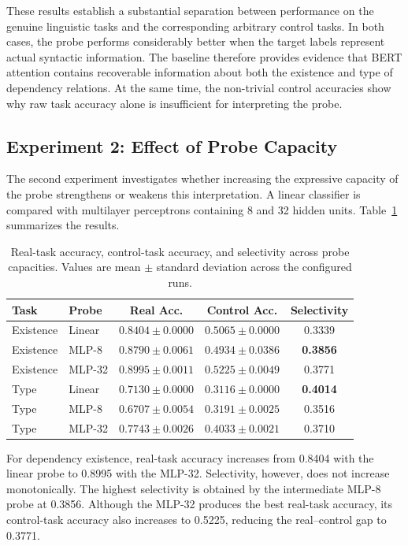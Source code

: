 \documentclass[12pt,a4paper]{article}
\begin{document}
These results establish a substantial separation between performance on the genuine linguistic tasks and the corresponding arbitrary control tasks. In both cases, the probe performs considerably better when the target labels represent actual syntactic information. The baseline therefore provides evidence that BERT attention contains recoverable information about both the existence and type of dependency relations. At the same time, the non-trivial control accuracies show why raw task accuracy alone is insufficient for interpreting the probe.

\subsection{Experiment 2: Effect of Probe Capacity}

The second experiment investigates whether increasing the expressive capacity of the probe strengthens or weakens this interpretation. A linear classifier is compared with multilayer perceptrons containing 8 and 32 hidden units. Table~\ref{tab:capacity-results} summarizes the results.

\begin{table}[htbp]
\centering
\small
\caption{Real-task accuracy, control-task accuracy, and selectivity across probe capacities. Values are mean $\pm$ standard deviation across the configured runs.}
\label{tab:capacity-results}
\begin{tabular}{llccc}
\toprule
\textbf{Task} & \textbf{Probe} & \textbf{Real Acc.} & \textbf{Control Acc.} & \textbf{Selectivity} \\
\midrule
Existence & Linear & $0.8404 \pm 0.0000$ & $0.5065 \pm 0.0000$ & 0.3339 \\
Existence & MLP-8 & $0.8790 \pm 0.0061$ & $0.4934 \pm 0.0386$ & \textbf{0.3856} \\
Existence & MLP-32 & $\mathbf{0.8995} \pm 0.0011$ & $0.5225 \pm 0.0049$ & 0.3771 \\
\midrule
Type & Linear & $0.7130 \pm 0.0000$ & $0.3116 \pm 0.0000$ & \textbf{0.4014} \\
Type & MLP-8 & $0.6707 \pm 0.0054$ & $0.3191 \pm 0.0025$ & 0.3516 \\
Type & MLP-32 & $\mathbf{0.7743} \pm 0.0026$ & $0.4033 \pm 0.0021$ & 0.3710 \\
\bottomrule
\end{tabular}
\end{table}

For dependency existence, real-task accuracy increases from 0.8404 with the linear probe to 0.8995 with the MLP-32. Selectivity, however, does not increase monotonically. The highest selectivity is obtained by the intermediate MLP-8 probe at 0.3856. Although the MLP-32 produces the best real-task accuracy, its control-task accuracy also increases to 0.5225, reducing the real--control gap to 0.3771.
\end{document}
